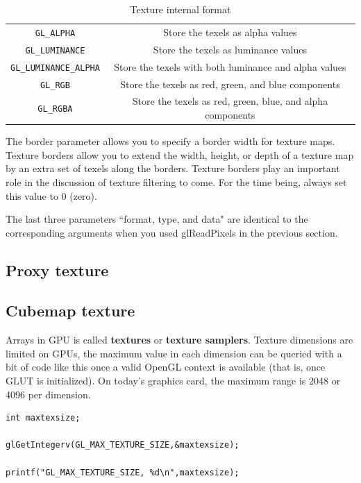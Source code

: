 \begin{table}[hbt]
\begin{center}
\caption{Texture internal format}
\begin{tabular}{cc} 
\hline
\verb!GL_ALPHA!& Store the texels as alpha values\\
\verb!GL_LUMINANCE!& Store the texels as luminance values\\
\verb!GL_LUMINANCE_ALPHA! & Store the texels with both luminance and alpha values\\
\verb!GL_RGB!& Store the texels as red, green, and blue components\\
\verb!GL_RGBA! & Store the texels as red, green, blue, and alpha components\\
\hline\hline
\end{tabular}
\end{center}
\label{tab:texture_internal_format}
\end{table}

The border parameter allows you to specify a border width for texture
maps. Texture borders allow you to extend the width, height, or depth
of a texture map by an extra set of texels along the borders. Texture
borders play an important role in the discussion of texture filtering
to come. For the time being, always set this value to 0 (zero).


The last three parameters ``format, type, and data" are identical to the
corresponding arguments when you used glReadPixels in the previous
section. 

\subsection{Proxy texture}
\label{sec:proxy-texture}



\subsection{Cubemap texture}
\label{sec:cubemap-texture}


Arrays in GPU is called {\bf textures} or {\bf texture samplers}.
Texture dimensions are limited on GPUs, the maximum value in each
dimension can be queried with a bit of code like this once a valid
OpenGL context is available (that is, once GLUT is initialized). On
today's graphics card, the maximum range is 2048 or 4096 per
dimension.

\begin{verbatim}
int maxtexsize;

glGetIntegerv(GL_MAX_TEXTURE_SIZE,&maxtexsize);

printf("GL_MAX_TEXTURE_SIZE, %d\n",maxtexsize);   
\end{verbatim}


